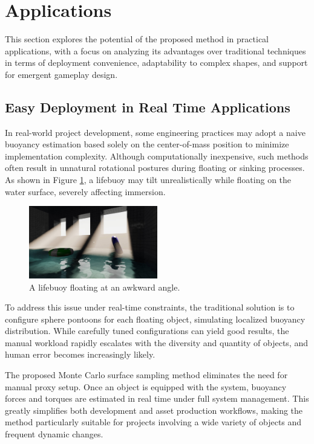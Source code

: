\section{Applications}

This section explores the potential of the proposed method in practical applications, with a focus on analyzing its advantages over traditional techniques in terms of deployment convenience, adaptability to complex shapes, and support for emergent gameplay design.

\subsection{Easy Deployment in Real Time Applications}

In real-world project development, some engineering practices may adopt a naive buoyancy estimation based solely on the center-of-mass position to minimize implementation complexity. Although computationally inexpensive, such methods often result in unnatural rotational postures during floating or sinking processes. As shown in Figure \ref{fig:bad-donut}, a lifebuoy may tilt unrealistically while floating on the water surface, severely affecting immersion.

\begin{figure}[H]
	\centering
	\includegraphics[width=0.5\textwidth]{./figures/bad-donut.jpg}
	\caption{A lifebuoy floating at an awkward angle.}
	\label{fig:bad-donut}
\end{figure}

To address this issue under real-time constraints, the traditional solution is to configure sphere pontoons for each floating object, simulating localized buoyancy distribution. While carefully tuned configurations can yield good results, the manual workload rapidly escalates with the diversity and quantity of objects, and human error becomes increasingly likely.

The proposed Monte Carlo surface sampling method eliminates the need for manual proxy setup. Once an object is equipped with the system, buoyancy forces and torques are estimated in real time under full system management. This greatly simplifies both development and asset production workflows, making the method particularly suitable for projects involving a wide variety of objects and frequent dynamic changes.

